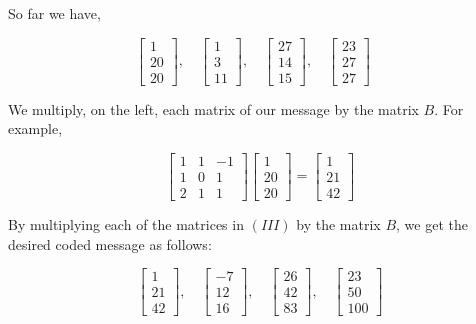 \begin{solution}
    So far we have,

    \[
        \left[ \begin{array}{c} 1 \\ 20 \\ 20 \end{array} \right], \quad
        \left[ \begin{array}{c} 1 \\ 3 \\ 11 \end{array} \right], \quad
        \left[ \begin{array}{c} 27 \\ 14 \\ 15 \end{array} \right], \quad
        \left[ \begin{array}{c} 23 \\ 27 \\ 27 \end{array} \right] \quad
    \]

    We multiply, on the left, each matrix of our message by the matrix \( B \). For example,

    \[
        \begin{bmatrix} 1 & 1 & -1 \\ 1 & 0 & 1 \\ 2 & 1 & 1 \end{bmatrix}
        \begin{bmatrix} 1 \\ 20 \\ 20 \end{bmatrix} = \begin{bmatrix} 1 \\ 21 \\ 42 \end{bmatrix}
    \]

    By multiplying each of the matrices in \( (III) \) by the matrix \( B \), we get the desired coded message as follows:

    \[
        \begin{bmatrix} 1 \\ 21 \\ 42 \end{bmatrix}, \quad
        \begin{bmatrix} -7 \\ 12 \\ 16 \end{bmatrix}, \quad
        \begin{bmatrix} 26 \\ 42 \\ 83 \end{bmatrix}, \quad
        \begin{bmatrix} 23 \\ 50 \\ 100 \end{bmatrix}
    \]


\end{solution}
